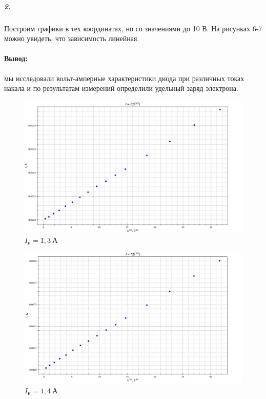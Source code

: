 \documentclass[a4paper,12pt]{article}
\begin{document}
\subparagraph{2.}Построим графики в тех координатах, но со значениями до 10 В. На рисунках 6-7 можно увидеть, что зависимость линейная.

\paragraph{Вывод:} мы исследовали вольт-амперные характеристики диода при различных токах накала и по результатам измерений определили удельный заряд электрона.

\newpage
\begin{figure}[!h]
\centering
\includegraphics[width=0.9\linewidth]{VI=1,3.png}
\caption{$I_{н}=1,3~А$}
\label{fig:mpr}
\end{figure}
\begin{figure}[!h]
\centering
\includegraphics[width=0.9\linewidth]{VI=1,4.png}
\caption{$I_{н}=1,4~А$}
\label{fig:mpr}
\end{figure}
\end{document}
